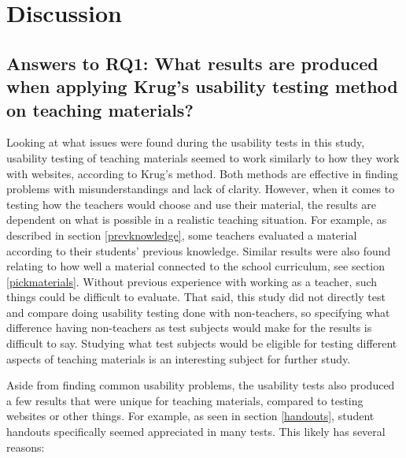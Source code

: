 \chapter{Discussion}

\section{Answers to RQ1: What results are produced when applying Krug's usability testing method on teaching materials?}

Looking at what issues were found during the usability tests in this study, usability testing of teaching materials seemed to work similarly to how they work with websites, according to Krug's method. Both methods are effective in finding problems with misunderstandings and lack of clarity. However, when it comes to testing how the teachers would choose and use their material, the results are dependent on what is possible in a realistic teaching situation. For example, as described in section \ref{prevknowledge}, some teachers evaluated a material according to their students' previous knowledge. Similar results were also found relating to how well a material connected to the school curriculum, see section \ref{pickmaterials}. Without previous experience with working as a teacher, such things could be difficult to evaluate. That said, this study did not directly test and compare doing usability testing done with non-teachers, so specifying what difference having non-teachers as test subjects would make for the results is difficult to say. Studying what test subjects would be eligible for testing different aspects of teaching materials is an interesting subject for further study.

Aside from finding common usability problems, the usability tests also produced a few results that were unique for teaching materials, compared to testing websites or other things. For example, as seen in section \ref{handouts}, student handouts specifically seemed appreciated in many tests. This likely has several reasons:

